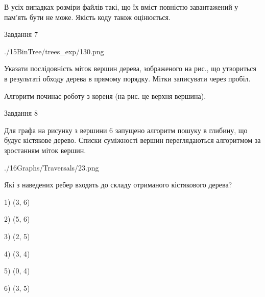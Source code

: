 \documentclass[12pt, ukrainian]{article}
\begin{document}
{В усіх випадках розміри файлів такі, що їх вміст повністю завантажений у пам'ять бути не може. Якість коду також оцінюється.



\vspace{10mm}\par

\newpage
\begin{minipage}[t]{9.7cm}
               
{\begin{center}Завдання {7}\end{center}}
\vspace{-6mm}

\begin{center}
	{./15BinTree/trees_exp/130.png}
\end{center}
Указати послідовність міток вершин дерева, зображеного на рис., що утвориться в результаті обходу дерева в прямому порядку. Мітки записувати через пробіл.\par Алгоритм починає роботу з кореня (на рис. це верхня вершина).\par

\end{minipage}
\vline \hspace{8mm}
\begin{minipage}[t]{8.0cm}
               
{\begin{center}Завдання {8}\end{center}}
\vspace{-6mm}
Для графа на рисунку з вершини 6 запущено алгоритм пошуку в глибину, що будує кістякове дерево. Списки суміжності вершин переглядаються алгоритмом за зростанням міток вершин.\par
\begin{center}
	{./16Graphs/Traversals/23.png}
\end{center}
\par Які з наведених ребер входять до складу отриманого кістякового дерева?\par
1) (3, 6)\par
2) (5, 6)\par
3) (2, 5)\par
4) (3, 4)\par
5) (0, 4)\par
6) (3, 5)\par
{\vskip 15pt} \par


\end{minipage}}
\end{document}
